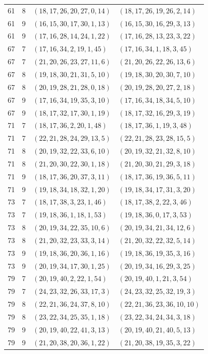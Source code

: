 \documentclass[11pt,a4paper,oneside,openany]{book}
\theoremstyle{definition}
\numberwithin{equation}{chapter}
\begin{document}
\begin{longtable}{rrll}
61&8&$(18,17,26,20,27,0,14)$&$(18,17,26,19,26,2,14)$\\
61&9&$(16,15,30,17,30,1,13)$&$(16,15,30,16,29,3,13)$\\
61&9&$(17,16,28,14,24,1,22)$&$(17,16,28,13,23,3,22)$\\
67&7&$(17,16,34,2,19,1,45)$&$(17,16,34,1,18,3,45)$\\
67&7&$(21,20,26,23,27,11,6)$&$(21,20,26,22,26,13,6)$\\
67&8&$(19,18,30,21,31,5,10)$&$(19,18,30,20,30,7,10)$\\
67&8&$(20,19,28,21,28,0,18)$&$(20,19,28,20,27,2,18)$\\
67&9&$(17,16,34,19,35,3,10)$&$(17,16,34,18,34,5,10)$\\
67&9&$(18,17,32,17,30,1,19)$&$(18,17,32,16,29,3,19)$\\
71&7&$(18,17,36,2,20,1,48)$&$(18,17,36,1,19,3,48)$\\
71&7&$(22,21,28,24,29,13,5)$&$(22,21,28,23,28,15,5)$\\
71&8&$(20,19,32,22,33,6,10)$&$(20,19,32,21,32,8,10)$\\
71&8&$(21,20,30,22,30,1,18)$&$(21,20,30,21,29,3,18)$\\
71&9&$(18,17,36,20,37,3,11)$&$(18,17,36,19,36,5,11)$\\
71&9&$(19,18,34,18,32,1,20)$&$(19,18,34,17,31,3,20)$\\
73&7&$(18,17,38,3,23,1,46)$&$(18,17,38,2,22,3,46)$\\
73&7&$(19,18,36,1,18,1,53)$&$(19,18,36,0,17,3,53)$\\
73&8&$(20,19,34,22,35,10,6)$&$(20,19,34,21,34,12,6)$\\
73&8&$(21,20,32,23,33,3,14)$&$(21,20,32,22,32,5,14)$\\
73&9&$(19,18,36,20,36,1,16)$&$(19,18,36,19,35,3,16)$\\
73&9&$(20,19,34,17,30,1,25)$&$(20,19,34,16,29,3,25)$\\
79&7&$(20,19,40,2,22,1,54)$&$(20,19,40,1,21,3,54)$\\
79&7&$(24,23,32,26,33,17,3)$&$(24,23,32,25,32,19,3)$\\
79&8&$(22,21,36,24,37,8,10)$&$(22,21,36,23,36,10,10)$\\
79&8&$(23,22,34,25,35,1,18)$&$(23,22,34,24,34,3,18)$\\
79&9&$(20,19,40,22,41,3,13)$&$(20,19,40,21,40,5,13)$\\
79&9&$(21,20,38,20,36,1,22)$&$(21,20,38,19,35,3,22)$\\
\bottomrule\end{longtable}
\endgroup
\end{document}
